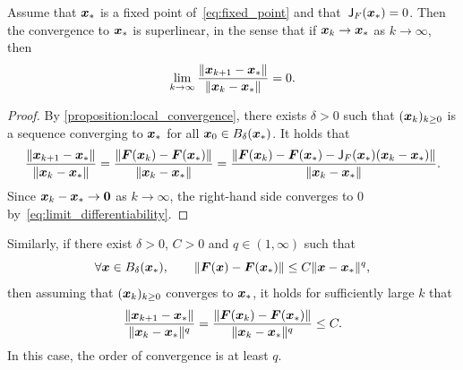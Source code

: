 \begin{proposition}
    \label{proposition:superlinear_convergence}
    Assume that $\vect x_*$ is a fixed point of~\eqref{eq:fixed_point} and that~$\mat J_F(\vect x_*) = 0$.
    Then the convergence to $\vect x_*$ is superlinear,
    in the sense that if $\vect x_k \to \vect x_*$ as $k \to \infty$,
    then
    \[
        \lim_{k \to \infty} \frac{\norm{\vect x_{k+1} - \vect x_*}}{\norm{\vect x_k - \vect x_*}} = 0.
    \]
\end{proposition}
\begin{proof}
    By \cref{proposition:local_convergence},
    there exists $\delta > 0$ such that $(\vect x_k)_{k\geq 0}$ is a sequence converging to $\vect x_*$ for all $\vect x_0 \in B_{\delta}(\vect x_*)$.
    It holds that
    \[
        \frac{\norm{\vect x_{k+1} - \vect x_*}}{\norm{\vect x_k - \vect x_*}}
        = \frac{\norm{\vect F(\vect x_{k}) - \vect F(\vect x_*)}}{\norm{\vect x_k - \vect x_*}}
        =  \frac{\norm{\vect F(\vect x_{k}) - \vect F(\vect x_*) - \mat J_F(\vect x_*) (\vect x_k - \vect x_*)}}{\norm{\vect x_k - \vect x_*}}.
    \]
    Since $\vect x_k - \vect x_* \to \vect 0$ as $k \to \infty$,
    the right-hand side converges to 0 by~\eqref{eq:limit_differentiability}.
\end{proof}

Similarly, if there exist $\delta > 0$, $C > 0$ and $q \in (1, \infty)$ such that
\[
    \forall \vect x \in B_{\delta}(\vect x_*), \qquad
    \norm{\vect F(\vect x) - \vect F(\vect x_*)} \leq C \norm{\vect x - \vect x_*}^q,
\]
then assuming that $(\vect x_k)_{k\geq0}$ converges to $\vect x_*$,
it holds for sufficiently large $k$ that
\[
    \frac{\norm{\vect x_{k+1} - \vect x_*}}{\norm{\vect x_k - \vect x_*}^q}
    = \frac{\norm{\vect F(\vect x_{k}) - \vect F(\vect x_*)}}{\norm{\vect x_k - \vect x_*}^q}
    \leq C.
\]
In this case, the order of convergence is at least $q$.

